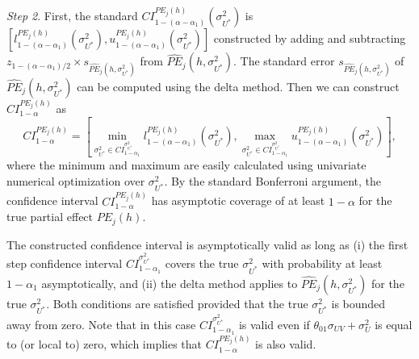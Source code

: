 \documentclass[12pt]{article}
\begin{document}
\noindent \textit{Step 2}. First, the standard $CI_{1-\left( \alpha -\alpha
_{1}\right) }^{PE_{j}(h)}\left( \sigma _{U^{\ast }}^{2}\right) $ is $\left[
l_{1-\left( \alpha -\alpha _{1}\right) }^{PE_{j}(h)}\left( \sigma _{U^{\ast
}}^{2}\right) ,u_{1-\left( \alpha -\alpha _{1}\right) }^{PE_{j}(h)}\left(
\sigma _{U^{\ast }}^{2}\right) \right]$ constructed by adding and
subtracting $z_{1-(\alpha -\alpha _{1})/2}\times s_{\widehat{PE}%
_{j}(h,\sigma _{U^{\ast }}^{2})}$ from $\widehat{PE}_{j}(h,\sigma _{U^{\ast
}}^{2})$. The standard error $s_{\widehat{PE}_{j}(h,\sigma _{U^{\ast
}}^{2})} $ of $\widehat{PE}_{j}(h,\sigma _{U^{\ast }}^{2})$ can be computed
using the delta method. Then we can construct $CI_{1-\alpha }^{PE_{j}(h)}$
as 
\begin{equation*}
CI_{1-\alpha }^{PE_{j}(h)} = \left[\min_{\sigma _{U^{\ast }}^{2}\in
CI_{1-\alpha _{1}}^{\sigma _{U^{\ast }}^{2}}}l_{1-\left( \alpha -\alpha
_{1}\right) }^{PE_{j}(h)}\left( \sigma _{U^{\ast }}^{2}\right) ,
\max_{\sigma _{U^{\ast }}^{2}\in CI_{1-\alpha _{1}}^{\sigma _{U^{\ast
}}^{2}}}u_{1-\left( \alpha -\alpha _{1}\right) }^{PE_{j}(h)}\left( \sigma
_{U^{\ast }}^{2}\right)\right] ,
\end{equation*}%
where the minimum and maximum are easily calculated using univariate
numerical optimization over $\sigma _{U^{\ast }}^{2}$. By the standard
Bonferroni argument, the confidence interval $CI_{1-\alpha }^{PE_{j}(h)}$
has asymptotic coverage of at least $1-\alpha $ for the true partial effect $%
PE_{j}(h)$.

\smallskip

The constructed confidence interval is asymptotically valid as long as (i)
the first step confidence interval $CI_{1-\alpha _{1}}^{\sigma _{U^{\ast
}}^{2}}$ covers the true $\sigma _{U^{\ast }}^{2}$ with probability at least 
$1-\alpha _{1}$ asymptotically, and (ii) the delta method applies to $%
\widehat{PE}_{j}(h,\sigma _{U^{\ast }}^{2})$ for the true $\sigma _{U^{\ast
}}^{2}$. Both conditions are satisfied provided that the true $\sigma
_{U^{\ast }}^{2}$ is bounded away from zero. Note that in this case $%
CI_{1-\alpha _{1}}^{\sigma _{U^{\ast }}^{2}}$ is valid even if $\theta
_{01}\sigma _{UV}+\sigma _{U}^{2}$ is equal to (or local to) zero, which
implies that $CI_{1-\alpha }^{PE_{j}(h)}$ is also valid.
\end{document}
